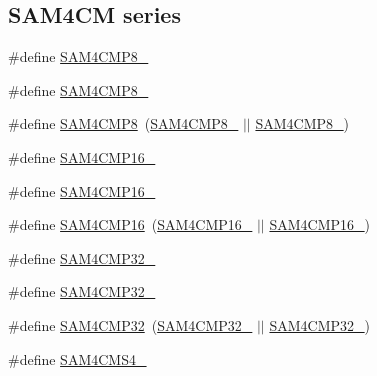 \subsection*{S\+A\+M4\+CM series}
\begin{DoxyCompactItemize}
\item 
\#define \mbox{\hyperlink{group__sam__part__macros__group_gadaadeb2fb79d513f13503d300ab9c95d}{S\+A\+M4\+C\+M\+P8\+\_}}
\item 
\#define \mbox{\hyperlink{group__sam__part__macros__group_ga7f686a5c46c9cfa8ab0d97ec4f257fb7}{S\+A\+M4\+C\+M\+P8\+\_}}
\item 
\#define \mbox{\hyperlink{group__sam__part__macros__group_gaa4e043324d8d27ea8696a3f7ec2bc418}{S\+A\+M4\+C\+M\+P8}}~(\mbox{\hyperlink{group__sam__part__macros__group_gadaadeb2fb79d513f13503d300ab9c95d}{S\+A\+M4\+C\+M\+P8\+\_}} $\vert$$\vert$ \mbox{\hyperlink{group__sam__part__macros__group_ga7f686a5c46c9cfa8ab0d97ec4f257fb7}{S\+A\+M4\+C\+M\+P8\+\_}})
\item 
\#define \mbox{\hyperlink{group__sam__part__macros__group_ga3c4d12eff2cac193d008a1a33763cdea}{S\+A\+M4\+C\+M\+P16\+\_}}
\item 
\#define \mbox{\hyperlink{group__sam__part__macros__group_ga1339cdbe5a862d94adeeae3b32f2c8c7}{S\+A\+M4\+C\+M\+P16\+\_}}
\item 
\#define \mbox{\hyperlink{group__sam__part__macros__group_gab16db9007bc5867acbea45ee0ff90d24}{S\+A\+M4\+C\+M\+P16}}~(\mbox{\hyperlink{group__sam__part__macros__group_ga3c4d12eff2cac193d008a1a33763cdea}{S\+A\+M4\+C\+M\+P16\+\_}} $\vert$$\vert$ \mbox{\hyperlink{group__sam__part__macros__group_ga1339cdbe5a862d94adeeae3b32f2c8c7}{S\+A\+M4\+C\+M\+P16\+\_}})
\item 
\#define \mbox{\hyperlink{group__sam__part__macros__group_gaf581d4fe9779afce853dfe577bdeb67b}{S\+A\+M4\+C\+M\+P32\+\_}}
\item 
\#define \mbox{\hyperlink{group__sam__part__macros__group_gadcf0406c9868af4d67e4eeaca0b641ac}{S\+A\+M4\+C\+M\+P32\+\_}}
\item 
\#define \mbox{\hyperlink{group__sam__part__macros__group_ga136b64aeed2d33cfa1e286fc3c47a606}{S\+A\+M4\+C\+M\+P32}}~(\mbox{\hyperlink{group__sam__part__macros__group_gaf581d4fe9779afce853dfe577bdeb67b}{S\+A\+M4\+C\+M\+P32\+\_}} $\vert$$\vert$ \mbox{\hyperlink{group__sam__part__macros__group_gadcf0406c9868af4d67e4eeaca0b641ac}{S\+A\+M4\+C\+M\+P32\+\_}})
\item 
\#define \mbox{\hyperlink{group__sam__part__macros__group_gac5948c5b98244c8de9c1eeab81f04f35}{S\+A\+M4\+C\+M\+S4\+\_}}
$$
\end{DoxyCompactItemize}
